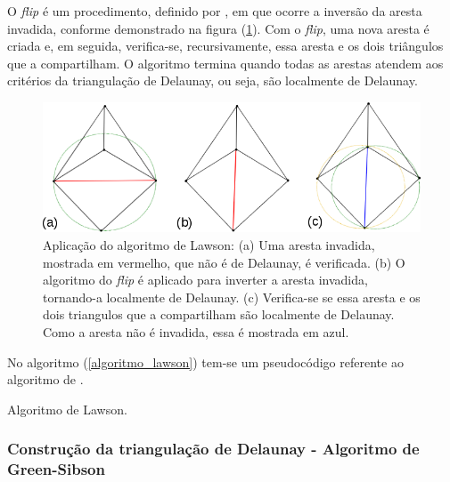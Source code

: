 O {\it flip} é um procedimento, definido por , em que ocorre a inversão da aresta invadida, conforme demonstrado na figura (\ref{fig_flip}). Com o {\it flip}, uma nova aresta é criada e, em seguida, verifica-se, recursivamente, essa aresta e os dois triângulos que a compartilham. O algoritmo termina quando todas as arestas atendem aos critérios da triangulação de Delaunay, ou seja, são localmente de Delaunay.  

\begin{figure}[!ht]
  \centering
  \includegraphics[width=350pt]{imagens_delaunay/novo_flip.png}
  \caption{\footnotesize{Aplicação do algoritmo de Lawson: (a) Uma aresta invadida, mostrada em vermelho, que não é de Delaunay, é verificada. (b) O algoritmo do {\it flip} é aplicado para inverter a aresta invadida, tornando-a localmente de Delaunay. (c) Verifica-se se essa aresta e os dois triangulos que a compartilham são localmente de Delaunay. Como a aresta não é invadida, essa é mostrada em azul.
}}
  \label{fig_flip}
\end{figure}

No algoritmo (\ref{algoritmo_lawson}) tem-se um pseudocódigo referente ao algoritmo de .

\begin{algorithm}[!ht]
\caption{Algoritmo de Lawson.} 
\label{algoritmo_lawson}
\end{algorithm} 

\subsubsection{Construção da triangulação de Delaunay - Algoritmo de Green-Sibson}
\label{cap_algoritmo_green_sibson}


